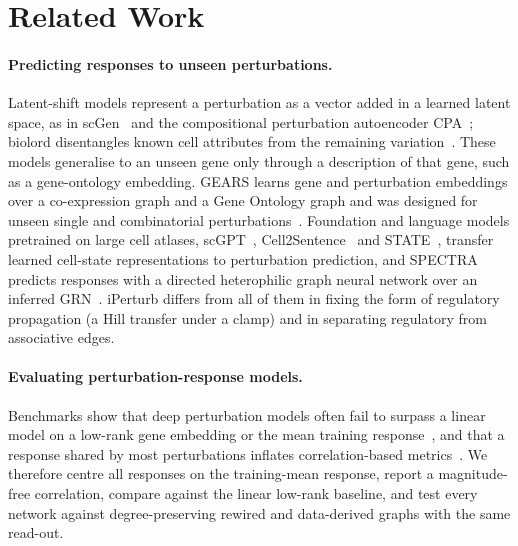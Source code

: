 \section{Related Work}
\label{sec:related}

\paragraph{Predicting responses to unseen perturbations.}
Latent-shift models represent a perturbation as a vector added in a learned latent space, as in scGen~\cite{lotfollahi2019scgen} and the compositional perturbation autoencoder CPA~\cite{lotfollahi2023predicting}; biolord disentangles known cell attributes from the remaining variation~\cite{piran2024biolord}.
These models generalise to an unseen gene only through a description of that gene, such as a gene-ontology embedding.
GEARS learns gene and perturbation embeddings over a co-expression graph and a Gene Ontology graph and was designed for unseen single and combinatorial perturbations~\cite{roohani2024predicting}.
Foundation and language models pretrained on large cell atlases, scGPT~\cite{cui2024scgpt}, Cell2Sentence~\cite{levine2024cell2sentence} and STATE~\cite{adduri2025predicting}, transfer learned cell-state representations to perturbation prediction, and SPECTRA predicts responses with a directed heterophilic graph neural network over an inferred GRN~\cite{calabro2026spectra}.
iPerturb differs from all of them in fixing the form of regulatory propagation (a Hill transfer under a clamp) and in separating regulatory from associative edges.

\paragraph{Evaluating perturbation-response models.}
Benchmarks show that deep perturbation models often fail to surpass a linear model on a low-rank gene embedding or the mean training response~\cite{ahlmanneltze2025comparison}, and that a response shared by most perturbations inflates correlation-based metrics~\cite{vinas2025systema}.
We therefore centre all responses on the training-mean response, report a magnitude-free correlation, compare against the linear low-rank baseline, and test every network against degree-preserving rewired and data-derived graphs with the same read-out.

